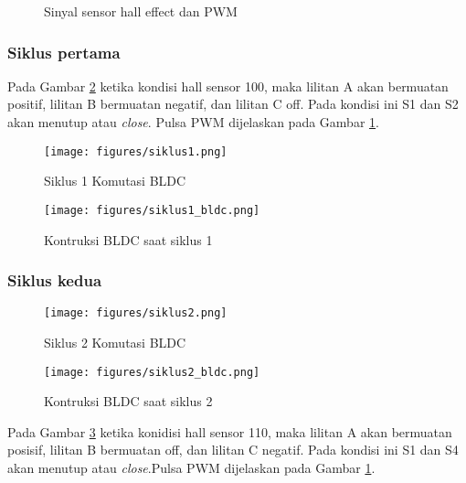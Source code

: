 \begin{figure}[!htb]
        \caption{Sinyal sensor hall effect dan PWM}
        \label{hall effect}
    \end{figure}
\subsubsection{Siklus pertama}
Pada Gambar \ref{siklus1} ketika kondisi hall sensor 100, maka lilitan A akan bermuatan positif, lilitan B bermuatan negatif, dan lilitan C off. Pada kondisi ini S1 dan S2 akan menutup atau \textit{close}. Pulsa PWM dijelaskan pada Gambar \ref{hall effect}. 
    \begin{figure}[!htb]
        \centering
        \texttt{[image: figures/siklus1.png]}
        \caption{Siklus 1 Komutasi BLDC}
        \label{siklus1}
    \end{figure}
    \begin{figure}[!htb]
        \centering
        \texttt{[image: figures/siklus1\_bldc.png]}
        \caption{Kontruksi BLDC saat siklus 1}
    \end{figure}
\newpage

\subsubsection{Siklus kedua}
    \begin{figure}[!htb]
        \centering
        \texttt{[image: figures/siklus2.png]}
        \caption{Siklus 2 Komutasi BLDC}
        \label{siklus2}
    \end{figure}
        \begin{figure}[!htb]
        \centering
        \texttt{[image: figures/siklus2\_bldc.png]}
        \caption{Kontruksi BLDC saat siklus 2}
    \end{figure}
Pada Gambar \ref{siklus2} ketika konidisi hall sensor 110, maka lilitan A akan bermuatan posisif, lilitan B bermuatan off, dan lilitan C negatif. Pada kondisi ini S1 dan S4 akan menutup atau \textit{close}.Pulsa PWM dijelaskan pada Gambar \ref{hall effect}. 
\newpage
